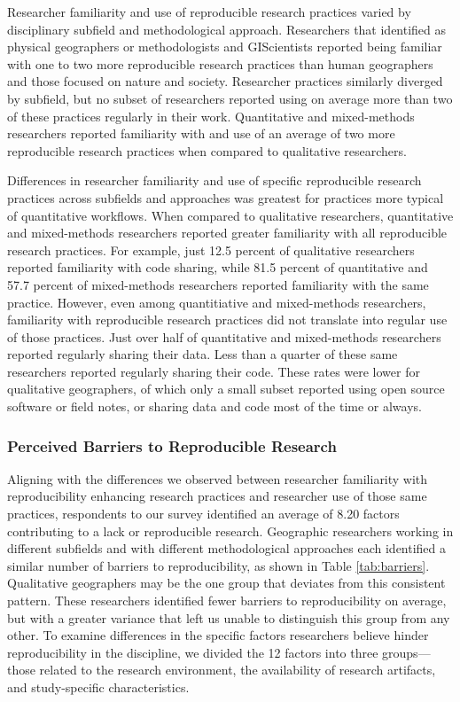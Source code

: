 \documentclass[]{interact}
\theoremstyle{plain}%
\theoremstyle{definition}
\theoremstyle{remark}
\begin{document}
Researcher familiarity and use of reproducible research practices varied by disciplinary subfield and methodological approach. 
Researchers that identified as physical geographers or methodologists and GIScientists reported being familiar with one to two more reproducible research practices than human geographers and those focused on nature and society.
Researcher practices similarly diverged by subfield, but no subset of researchers reported using on average more than two of these practices regularly in their work.  
Quantitative and mixed-methods researchers reported familiarity with and use of an average of two more reproducible research practices when compared to qualitative researchers.

Differences in researcher familiarity and use of specific reproducible research practices across subfields and approaches was greatest for practices more typical of quantitative workflows. 
When compared to qualitative researchers, quantitative and mixed-methods researchers reported greater familiarity with all reproducible research practices.
For example, just 12.5 percent of qualitative researchers reported familiarity with code sharing, while 81.5 percent of quantitative and 57.7 percent of mixed-methods researchers reported familiarity with the same practice.
However, even among quantitiative and mixed-methods researchers, familiarity with reproducible research practices did not translate into regular use of those practices.
Just over half of quantitative and mixed-methods researchers reported regularly sharing their data.
Less than a quarter of these same researchers reported regularly sharing their code. 
These rates were lower for qualitative geographers, of which only a small subset reported using open source software or field notes, or sharing data and code most of the time or always.

\subsubsection*{Perceived Barriers to Reproducible Research}
Aligning with the differences we observed between researcher familiarity with reproducibility enhancing research practices and researcher use of those same practices, respondents to our survey identified an average of 8.20 factors contributing to a lack or reproducible research. 
Geographic researchers working in different subfields and with different methodological approaches each identified a similar number of barriers to reproducibility, as shown in Table \ref{tab:barriers}.
Qualitative geographers may be the one group that deviates from this consistent pattern. 
These researchers identified fewer barriers to reproducibility on average, but with a greater variance that left us unable to distinguish this group from any other.
To examine differences in the specific factors researchers believe hinder reproducibility in the discipline, we divided the 12 factors into three groups---those related to the research environment, the availability of research artifacts, and study-specific characteristics. 
\end{document}
